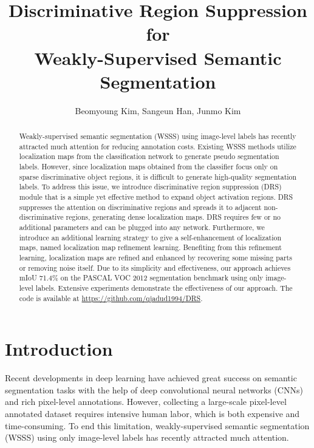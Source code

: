 \documentclass[letterpaper]{article} \usepackage{aaai21}  \usepackage{times}  \usepackage{helvet} \usepackage{courier}  \usepackage[hyphens]{url}  \usepackage{graphicx} \urlstyle{rm} \def\UrlFont{\rm}  \usepackage{natbib}  \usepackage{caption} \frenchspacing  \setlength{\pdfpagewidth}{8.5in}  \setlength{\pdfpageheight}{11in}
\title{Discriminative Region Suppression for \\Weakly-Supervised Semantic Segmentation}
\author{

Beomyoung Kim, Sangeun Han, Junmo Kim
    \\
}
\begin{document}
\maketitle

\begin{abstract}
Weakly-supervised semantic segmentation (WSSS) using image-level labels has recently attracted much attention for reducing annotation costs.
Existing WSSS methods utilize localization maps from the classification network to generate pseudo segmentation labels.
However, since localization maps obtained from the classifier focus only on sparse discriminative object regions, it is difficult to generate high-quality segmentation labels.
To address this issue, we introduce discriminative region suppression (DRS) module that is a simple yet effective method to expand object activation regions.
DRS suppresses the attention on discriminative regions and spreads it to adjacent non-discriminative regions, generating dense localization maps.
DRS requires few or no additional parameters and can be plugged into any network.
Furthermore, we introduce an additional learning strategy to give a self-enhancement of localization maps, named localization map refinement learning.
Benefiting from this refinement learning, localization maps are refined and enhanced by recovering some missing parts or removing noise itself.
Due to its simplicity and effectiveness, our approach achieves mIoU 71.4\% on the PASCAL VOC 2012 segmentation benchmark using only image-level labels.
Extensive experiments demonstrate the effectiveness of our approach.
The code is available at \url{https://github.com/qjadud1994/DRS}.
\end{abstract}


\section{Introduction}
\label{sec:intro}
Recent developments in deep learning have achieved great success on semantic segmentation tasks with the help of deep convolutional neural networks (CNNs) and rich pixel-level annotations.
However, collecting a large-scale pixel-level annotated dataset requires intensive human labor, which is both expensive and time-consuming.
To end this limitation, weakly-supervised semantic segmentation (WSSS) using only image-level labels has recently attracted much attention.
\end{document}
